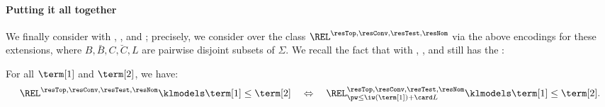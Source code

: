\documentclass[a4paper,UKenglish,cleveref, autoref, thm-restate]{lipics-v2021}
\newcommand{\vsig}{\Sigma}
\begin{document}
\paragraph*{Putting it all together}
We finally consider  with , , and ;
precisely, we consider  over the class
$\REL^{\resTop, \resConv, \resTest, \resNom}$ via the above encodings for these extensions,
where $B, \bar{B}, C, \breve{C}, L$ are pairwise disjoint subsets of $\vsig$.
We recall the fact that 
 with , , and 
still has the :
\begin{proposition}\label{proposition: ext bounded pw property}
    For all  $\term[1]$ and $\term[2]$,
    we have:
    \[\REL^{\resTop, \resConv, \resTest, \resNom} \klmodels \term[1] \le \term[2] \quad\Leftrightarrow\quad
    \REL^{\resTop, \resConv, \resTest, \resNom}_{\pw \le \iw(\term[1]) + \card L} \klmodels \term[1] \le \term[2].\]
\end{proposition}
\end{document}
